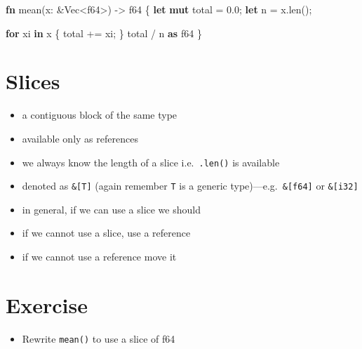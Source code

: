 \documentclass[
  letterpaper,
  DIV=11,
  numbers=noendperiod,
  oneside]{scrreprt}
\newenvironment{Shaded}{\begin{snugshade}}{\end{snugshade}}
\newcommand{\ControlFlowTok}[1]{\textcolor[rgb]{0.00,0.23,0.31}{\textbf{#1}}}
\newcommand{\DataTypeTok}[1]{\textcolor[rgb]{0.68,0.00,0.00}{#1}}
\newcommand{\DecValTok}[1]{\textcolor[rgb]{0.68,0.00,0.00}{#1}}
\newcommand{\KeywordTok}[1]{\textcolor[rgb]{0.00,0.23,0.31}{\textbf{#1}}}
\newcommand{\NormalTok}[1]{\textcolor[rgb]{0.00,0.23,0.31}{#1}}
\newcommand{\OperatorTok}[1]{\textcolor[rgb]{0.37,0.37,0.37}{#1}}
\providecommand{\tightlist}{%
  \setlength{\itemsep}{0pt}\setlength{\parskip}{0pt}}\usepackage{longtable,booktabs,array}
\begin{document}
\begin{Shaded}
\begin{Highlighting}[]
\KeywordTok{fn}\NormalTok{ mean(x}\OperatorTok{:} \OperatorTok{\&}\DataTypeTok{Vec}\OperatorTok{\textless{}}\DataTypeTok{f64}\OperatorTok{\textgreater{}}\NormalTok{) }\OperatorTok{{-}\textgreater{}} \DataTypeTok{f64} \OperatorTok{\{}
    \KeywordTok{let} \KeywordTok{mut}\NormalTok{ total }\OperatorTok{=} \DecValTok{0.0}\OperatorTok{;}
    \KeywordTok{let}\NormalTok{ n }\OperatorTok{=}\NormalTok{ x}\OperatorTok{.}\NormalTok{len()}\OperatorTok{;}

    \ControlFlowTok{for}\NormalTok{ xi }\KeywordTok{in}\NormalTok{ x }\OperatorTok{\{}
\NormalTok{        total }\OperatorTok{+=}\NormalTok{ xi}\OperatorTok{;}
    \OperatorTok{\}}
\NormalTok{    total }\OperatorTok{/}\NormalTok{ n }\KeywordTok{as} \DataTypeTok{f64}
\OperatorTok{\}}
\end{Highlighting}
\end{Shaded}

\section{Slices}\label{slices}

\begin{itemize}
\tightlist
\item
  a contiguous block of the same type
\item
  available only as references
\item
  we always know the length of a slice i.e.~\texttt{.len()} is available
\item
  denoted as \texttt{\&{[}T{]}} (again remember \texttt{T} is a generic
  type)---e.g.~\texttt{\&{[}f64{]}} or \texttt{\&{[}i32{]}}
\item
  in general, if we can use a slice we should
\item
  if we cannot use a slice, use a reference
\item
  if we cannot use a reference move it
\end{itemize}

\section{Exercise}\label{exercise-7}

\begin{itemize}
\tightlist
\item
  Rewrite \texttt{mean()} to use a slice of f64
\end{itemize}
\end{document}
